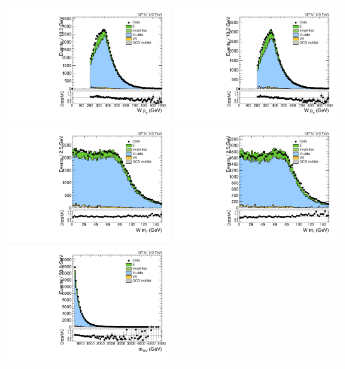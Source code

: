 \begin{figure}[htbp]
  \centering
  \includegraphics[width=0.3825\textwidth]{fig/analysisAppendix/SB_b1_mu_allP_allC_allD_Run2_lnujj_l1_pt.pdf}
  \includegraphics[width=0.3825\textwidth]{fig/analysisAppendix/SB_b1_e_allP_allC_allD_Run2_lnujj_l1_pt.pdf}\\
  \includegraphics[width=0.3825\textwidth]{fig/analysisAppendix/SB_b1_mu_allP_allC_allD_Run2_lnujj_l1_mt.pdf}
  \includegraphics[width=0.3825\textwidth]{fig/analysisAppendix/SB_b1_e_allP_allC_allD_Run2_lnujj_l1_mt.pdf}\\
  \includegraphics[width=0.3825\textwidth]{fig/analysisAppendix/SB_b1_mu_allP_allC_allD_Run2_mWV.pdf}

\end{figure}
